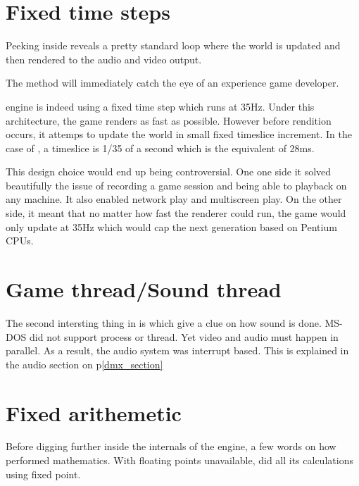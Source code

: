 \section{Fixed time steps}
Peeking inside  reveals a pretty standard loop where the world is updated and then rendered to the audio and video output.\\
\par
{}
The method  will immediately catch the eye of an experience game developer.\\
\par
{}
\par
\doom engine is indeed using a fixed time step which runs at 35Hz. Under this architecture, the game renders as fast as possible. However before rendition occurs, it attemps to update the world in small fixed timeslice increment. In the case of \doom, a timeslice is 1/35 of a second which is the equivalent of 28ms.\\
\par
{}
\par
This design choice would end up being controversial. One one side it solved beautifully the issue of recording a game session and being able to playback on any machine. It also enabled network play and multiscreen play. On the other side, it meant that no matter how fast the renderer could run, the game would only update at 35Hz which would cap the next generation based on Pentium CPUs.\\
\par



\section{Game thread/Sound thread}
The second intersting thing in  is  which give a clue on how sound is done. MS-DOS did not support process or thread. Yet video and audio must happen in parallel. As a result, the audio system was interrupt based. This is explained in the audio section on p\ref{dmx_section}\\







\section{Fixed arithemetic}
Before digging further inside the internals of the engine, a few words on how \doom performed mathematics. With floating points unavailable, did all its calculations using fixed point.\\
\par
{}

